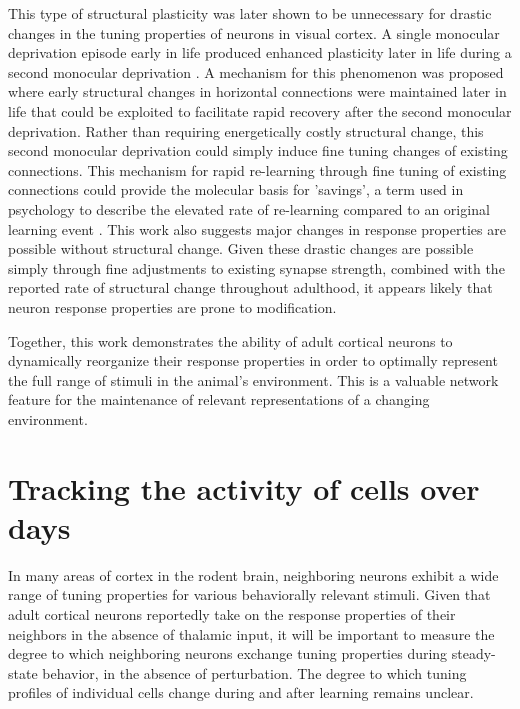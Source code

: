\bigskip

This type of structural plasticity was later shown to be unnecessary for drastic changes in the tuning properties of neurons in visual cortex. A single monocular deprivation episode early in life produced enhanced plasticity later in life during a second monocular deprivation \citep{Hofer2006, Hofer2009}. A mechanism for this phenomenon was proposed where early structural changes in horizontal connections were maintained later in life that could be exploited to facilitate rapid recovery after the second monocular deprivation. Rather than requiring energetically costly structural change, this second monocular deprivation could simply induce fine tuning changes of existing connections. This mechanism for rapid re-learning through fine tuning of existing connections could provide the molecular basis for 'savings', a term used in psychology to describe the elevated rate of re-learning compared to an original learning event \citep{Ebbinghaus1880}. This work also suggests major changes in response properties are possible without structural change. Given these drastic changes are possible simply through fine adjustments to existing synapse strength, combined with the reported rate of structural change throughout adulthood, it appears likely that neuron response properties are prone to modification.

\bigskip

Together, this work demonstrates the ability of adult cortical neurons to dynamically reorganize their response properties in order to optimally represent the full range of stimuli in the animal's environment. This is a valuable network feature for the maintenance of relevant representations of a changing environment.

\section{Tracking the activity of cells over days}

In many areas of cortex in the rodent brain, neighboring neurons exhibit a wide range of tuning properties for various behaviorally relevant stimuli. Given that adult cortical neurons reportedly take on the response properties of their neighbors in the absence of thalamic input, it will be important to measure the degree to which neighboring neurons exchange tuning properties during steady-state behavior, in the absence of perturbation. The degree to which tuning profiles of individual cells change during and after learning remains unclear.

